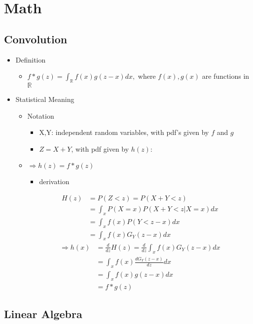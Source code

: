 \chapter{Math}

\section{Convolution}

\begin{itemize}
\item Definition
	\begin{itemize}
	\item $\displaystyle f* g (z) = \int_{\mathbb R}f(x)g(z-x) dx,$ where $f(x),g(x)$ are functions in $\mathbb R$
	\end{itemize}
	
\item Statistical Meaning
	\begin{itemize}
	\item Notation
		\begin{itemize}
		\item X,Y: independent random variables, with pdf's given by $f$ and $g$
		\item $Z = X+Y$, with pdf given by $h(z)$:
		\end{itemize}
		
	\item $\Rightarrow h(z) = f * g (z)$
		\begin{itemize}
		\item derivation
		\end{itemize}
	\begin{align*} H(z) &= P(Z<z) = P(X+Y<z) \\ &= \int_x P(X=x)P(X+Y<z|X=x) dx \\ &= \int_x f(x)P(Y<z-x)dx \\ &= \int_x f(x)G_Y(z-x)dx  \end{align*} 
	\begin{align*} \Rightarrow h(x) &= \frac d {dz} H(z) = \frac d {dz} \int_x f(x)G_Y(z-x)dx \\ &= \int_x f(x) \frac {dG_Y(z-x)}{dz} dx \\ &= \int_x f(x) g(z-x)dx \\ &= f * g (z) \end{align*}
	\end{itemize}
\end{itemize}
 
\section{Linear Algebra}

